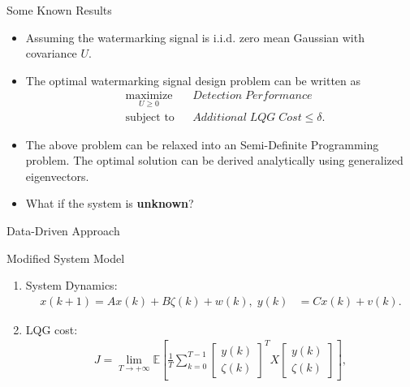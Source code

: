 \documentclass[10pt]{beamer}
\newcommand{\tikzdir}[1]{#1.tikz}
\newcommand{\inputtikz}[1]{}}
\begin{document}
\begin{frame}{Some Known Results}
  \begin{itemize}
  \item Assuming the watermarking signal is i.i.d. zero mean Gaussian with covariance $U$.
  \item The optimal watermarking signal design problem can be written as
    \begin{align*}
      &\mathop{\textrm{maximize}}\limits_{U\geq 0}&
      & Detection\;Performance\\
      &\textrm{subject to}&
      & Additional\;LQG\;Cost \leq \delta.
    \end{align*}
  \item The above problem can be relaxed into an Semi-Definite Programming problem. The optimal solution can be derived analytically using generalized eigenvectors.
  \item What if the system is \textbf{unknown}?
  \end{itemize}
\end{frame}
%
%
\begin{frame}{Data-Driven Approach}
  \begin{figure}[htpb]
    \inputtikz{systemdiagram2}
  \end{figure}
\end{frame}

\begin{frame}{Modified System Model}
  \begin{figure}
    \centering
  \end{figure}
  \begin{enumerate}
  \item System Dynamics:
  \begin{align*}
    x(k+1) = A x(k) + B\zeta(k)+w(k), \;y(k)  &= C x(k) + v(k) . 
  \end{align*}
  \item LQG cost:
	\begin{align*}
		J = \lim_{T \to +\infty} \mathbb E\left [\frac{1}{T}\sum_{k=0}^{T-1} \begin{bmatrix}
		y(k)\\
		\zeta(k)
		\end{bmatrix}^TX \begin{bmatrix}
		y(k)\\
		\zeta(k)
		\end{bmatrix} \right ],
	\end{align*}
  \end{enumerate}
\end{frame}
\end{document}

